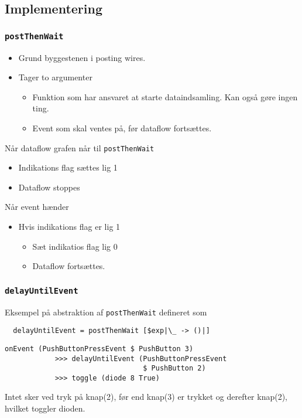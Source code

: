 \documentclass[t]{beamer}
\begin{document}
\subsection{Implementering}

\begin{frame}
  \frametitle{\texttt{postThenWait}}

  \begin{itemize}
  \item Grund byggestenen i posting wires.
  \item Tager to argumenter
    \begin{itemize}
    \item Funktion som har ansvaret at starte dataindsamling. Kan også gøre
      ingen ting.
    \item Event som skal ventes på, før dataflow fortsættes.
    \end{itemize}
  \end{itemize}

  Når dataflow grafen når til \texttt{postThenWait}

  \begin{itemize}
  \item Indikations flag sættes lig 1
  \item Dataflow stoppes
  \end{itemize}

  Når event hænder

  \begin{itemize}
  \item Hvis indikations flag er lig 1
    \begin{itemize}
    \item Sæt indikatios flag lig 0
    \item Dataflow fortsættes.
    \end{itemize}
  \end{itemize}


\end{frame}

\begin{frame}[fragile]
  \frametitle{\texttt{delayUntilEvent}}

  Eksempel på abstraktion af \texttt{postThenWait} defineret som

\begin{verbatim}
  delayUntilEvent = postThenWait [$exp|\_ -> ()|]
\end{verbatim}

  \begin{example}
\begin{verbatim}
onEvent (PushButtonPressEvent $ PushButton 3) 
            >>> delayUntilEvent (PushButtonPressEvent 
                                 $ PushButton 2)
            >>> toggle (diode 8 True)
\end{verbatim}
  \end{example}

  Intet sker ved tryk på knap(2), før end knap(3) er trykket og derefter
  knap(2), hvilket toggler dioden.

\end{frame}
\end{document}
